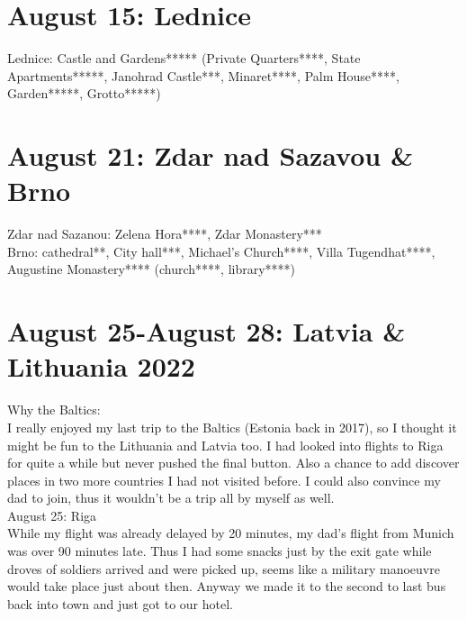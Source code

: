 \section{August 15:  Lednice}
\label{2022:Lednice}

Lednice: Castle and Gardens***** (Private Quarters****, State Apartments*****, Janohrad Castle***, Minaret****, Palm House****, Garden*****, Grotto*****)\\

\section{August 21:  Zdar nad Sazavou \& Brno}
\label{2022:zdarBrno}

Zdar nad Sazanou: Zelena Hora****, Zdar Monastery***\\
Brno: cathedral**, City hall***, Michael's Church****, Villa Tugendhat****, Augustine Monastery**** (church****, library****)\\

\section{August 25-August 28:  Latvia \& Lithuania 2022}
\label{2022:LatviaLithuania}

Why the Baltics:\\
I really enjoyed my last trip to the Baltics (Estonia back in 2017), so I thought it might be fun to the Lithuania and Latvia too. I had looked into flights to Riga for quite a while but never pushed the final button. Also a chance to add discover places in two more countries I had not visited before. I could also convince my dad to join, thus it wouldn't be a trip all by myself as well.\\

August 25: Riga\\
While my flight was already delayed by 20 minutes, my dad's flight from Munich was over 90 minutes late. Thus I had some snacks just by the exit gate while droves of soldiers arrived and were picked up, seems like a military manoeuvre would take place just about then. Anyway we made it to the second to last bus back into town and just got to our hotel.\\

